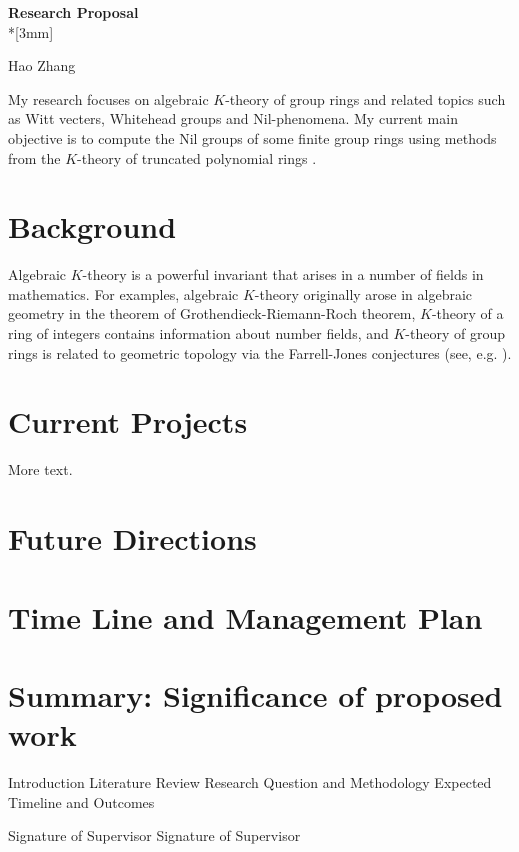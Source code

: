 \documentclass{proposalnsf}
\begin{document}
\begin{center}
{\LARGE{\bf Research Proposal}}\\*[3mm]

Hao Zhang\\

\end{center}
My research focuses on algebraic $K$-theory of group rings and related topics such as Witt vecters, Whitehead groups and Nil-phenomena. My current main objective is to compute the Nil groups of some finite group rings using methods from the $K$-theory of truncated polynomial rings \cite{MR86f:18017}.
\section{Background}
Algebraic $K$-theory is a powerful invariant that arises in a number of fields in mathematics.
For examples, algebraic $K$-theory originally arose in algebraic geometry in the theorem of
Grothendieck-Riemann-Roch theorem, $K$-theory of a ring of integers contains information about number fields, and $K$-theory of group rings is related to geometric topology via the
Farrell-Jones conjectures (see, e.g. ).


\section{Current Projects}

More text.

\section{Future Directions}


\section{Time Line and Management Plan}

\section{Summary:  Significance of proposed work}

 Introduction
Literature Review
Research Question and Methodology
Expected Timeline and Outcomes



\newpage





\vfill

Signature of Supervisor \uline{\hfill} Signature of Supervisor \uline{\hfill}
\end{document}
